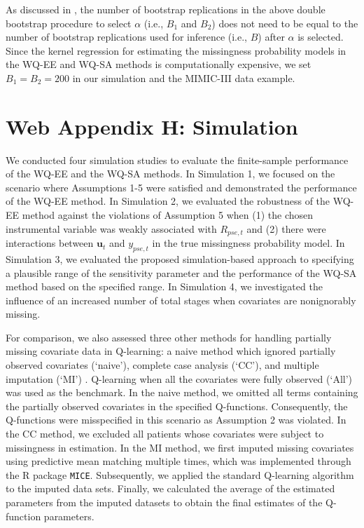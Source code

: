 \documentclass[12pt]{article}
\begin{document}

As discussed in \cite{chakraborty2013inference}, the number of bootstrap replications in the above double bootstrap procedure to select $\alpha$ (i.e., $B_1$ and $B_2$) does not  need to be equal to the number of  bootstrap replications used for inference (i.e., $B$) after $\alpha$ is selected. Since the kernel regression for estimating the missingness probability models  in the WQ-EE and WQ-SA methods is computationally expensive, we set $B_1=B_2=200$ in our simulation and the MIMIC-III data example.  

\section{Web Appendix H: Simulation}

We conducted four simulation studies to evaluate the finite-sample performance of the WQ-EE and the WQ-SA  methods. In Simulation 1, we focused on the scenario where Assumptions 1-5 were satisfied and demonstrated the performance of the WQ-EE method. In Simulation 2, we evaluated the robustness of the WQ-EE method against the violations of Assumption 5 when (1) the chosen instrumental variable was weakly associated with $R_{pse,t}$ and (2)  there were interactions between $\bm{u}_t$  and $y_{pse,t}$ in the true missingness probability model.  In Simulation 3, we evaluated the proposed simulation-based approach to specifying a plausible range of the sensitivity parameter and the performance of the WQ-SA method based on the specified
range. In Simulation 4, we investigated the influence of an increased number of total stages when covariates are nonignorably missing.  

For comparison, we also assessed three other methods for handling partially missing covariate data in Q-learning: a naive method which ignored partially observed covariates (`naive'), complete case analysis (`CC'), and multiple imputation (`MI') \citep{Little_Rubin_2014}. Q-learning when all the covariates were fully observed (`All') was used as the benchmark. In the naive method, we omitted all terms containing the partially observed covariates in the specified Q-functions. Consequently, the Q-functions were misspecified in this scenario as Assumption 2 was violated. In the CC method, we excluded all patients whose covariates were subject to missingness in estimation. In the MI method, we first imputed missing covariates using predictive mean matching multiple times, which was implemented through the R package \texttt{MICE}. Subsequently, we applied the standard Q-learning algorithm to the imputed data sets. Finally, we calculated the average of the estimated parameters from the imputed datasets to obtain the final estimates of the Q-function parameters. 
\end{document}
